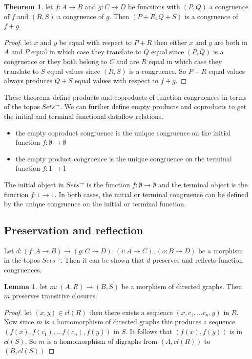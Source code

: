 \documentclass[a4paper,11pt, notitlepage]{report}
\theoremstyle{definition}
\newtheorem{theorem}{Theorem}[section]
\newtheorem{lemma}{Lemma}[section]
\begin{document}
\begin{theorem}
let $f: A \to B$ and $g: C \to D$ be functions with $(P,Q)$ a congruence of $f$ and $(R,S)$ a congruence of $g$. Then $(P + R, Q + S)$ is a congruence of $f + g$.
\end{theorem}

\begin{proof}
let $x$ and $y$ be equal with respect to $P + R$ then either $x$ and $y$ are both in $A$ and $P$ equal in which case they translate to $Q$ equal since $(P,Q)$ is a congruence or they both belong to $C$ and are $R$ equal in which case they translate to $S$ equal values since $(R,S)$ is a congruence. So $P + R$ equal values always produces $Q + S$ equal values with respect to $f + g$.
\end{proof}

These theorems define products and coproducts of function congruences in terms of the topos $Sets^{\to}$. We can further define empty products and coproducts to get the initial and terminal functional dataflow relations.

\begin{itemize}
 \item the empty coproduct congruence is the unique congruence on the initial function $f: \emptyset \to \emptyset$
 \item the empty product congruence is the unique congruence on the terminal function $f: 1 \to 1$
\end{itemize}

The initial object in $Sets^{\to}$ is the function $f: \emptyset \to \emptyset$ and the terminal object is the function $f: 1 \to 1$. In both cases, the initial or terminal congruence can be defined by the unique congruence on the initial or terminal function.

\newpage

\subsection{Preservation and reflection}
Let $d: (f: A \to B) \to (g: C \to D) : (i: A \to C), (o: B \to D)$ be a morphism in the topos $Sets^{\to}$. Then it can be shown that $d$ preserves and reflects function congruences.

\begin{lemma}
let $m: (A,R) \to (B,S)$ be a morphism of directed graphs. Then $m$ preserves transitive closures.
\end{lemma}

\begin{proof}
let $(x,y) \in cl(R)$ then there exists a sequence $(x,c_1,...c_n,y)$ in $R$. Now since $m$ is a homomorphism of directed graphs this produces a sequence $(f(x),f(c_1),...f(c_n),f(y))$ in $S$. It follows that $(f(x),f(y))$ is in $cl(S)$. So $m$ is a homomorphism of digraphs from $(A,cl(R))$ to $(B,cl(S))$
\end{proof}
\end{document}

